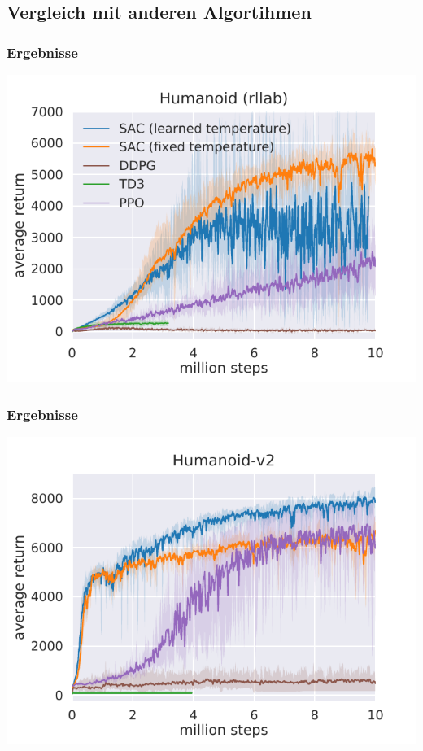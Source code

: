 \subsection{Vergleich mit anderen Algortihmen}
\begin{frame}
    \frametitle{Ergebnisse}
    \includegraphics[scale=0.8]{figures/humanoid-rllab.pdf}
\end{frame}
\begin{frame}
    \frametitle{Ergebnisse}
    \includegraphics[scale=0.8]{figures/humanoid-gym.pdf}
\end{frame}
